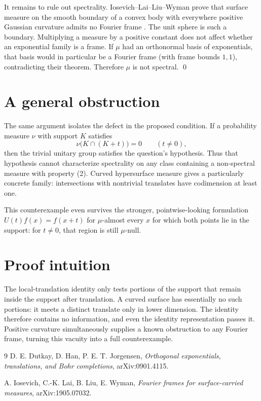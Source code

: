 \documentclass[10pt]{article}
\begin{document}
It remains to rule out spectrality.  Iosevich--Lai--Liu--Wyman prove that
surface measure on the smooth boundary of a convex body with everywhere
positive Gaussian curvature admits no Fourier frame \cite[Theorem~1.1]{ILLW}.
The unit sphere is such a boundary.  Multiplying a measure by a positive
constant does not affect whether an exponential family is a frame.  If
$\mu$ had an orthonormal basis of exponentials, that basis would in particular
be a Fourier frame (with frame bounds $1,1$), contradicting their theorem.
Therefore $\mu$ is not spectral. \qed

\section*{A general obstruction}

The same argument isolates the defect in the proposed condition.  If a
probability measure $\nu$ with support $K$ satisfies
\[
 \nu\bigl(K\cap(K+t)\bigr)=0\qquad(t\ne0),                       \tag{2}
\]
then the trivial unitary group satisfies the question's hypothesis.  Thus
that hypothesis cannot characterize spectrality on any class containing a
non-spectral measure with property (2).  Curved hypersurface measure gives a
particularly concrete family: intersections with nontrivial translates have
codimension at least one.

This counterexample even survives the stronger, pointwise-looking
formulation $U(t)f(x)=f(x+t)$ for $\mu$-almost every $x$ for which both points
lie in the support: for $t\ne0$, that region is still $\mu$-null.

\section*{Proof intuition}

The local-translation identity only tests portions of the support that remain
inside the support after translation.  A curved surface has essentially no
such portions: it meets a distinct translate only in lower dimension.  The
identity therefore contains no information, and even the identity
representation passes it.  Positive curvature simultaneously supplies a
known obstruction to any Fourier frame, turning this vacuity into a full
counterexample.

\begin{thebibliography}{9}
D. E. Dutkay, D. Han, P. E. T. Jorgensen,
\emph{Orthogonal exponentials, translations, and Bohr completions},
arXiv:0901.4115.

A. Iosevich, C.-K. Lai, B. Liu, E. Wyman,
\emph{Fourier frames for surface-carried measures},
arXiv:1905.07032.
\end{thebibliography}
\end{document}
